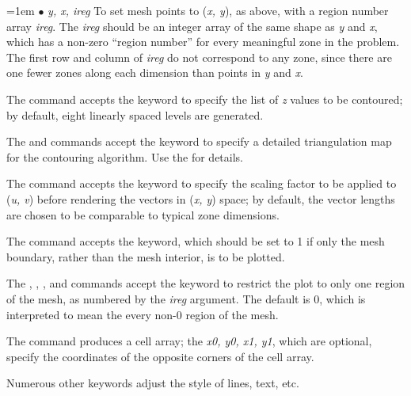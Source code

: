 \hangindent=1em
$\bullet$ {\it y, x, ireg} \hfil\break
To set mesh points to ({\it x, y\/}), as above, with a region number array
{\it ireg}.  The {\it ireg\/} should be an integer array of the same
shape as {\it y\/} and {\it x}, which has a non-zero ``region number'' for
every meaningful zone in the problem.  The first row and column of
{\it ireg\/} do not correspond to any zone, since there are one fewer zones
along each dimension than points in {\it y\/} and {\it x}.

The  command accepts the  keyword to specify the list of
{\it z\/} values to be contoured; by default, eight linearly spaced levels
are generated.

The  and  commands accept the  keyword
to specify a detailed triangulation map for the contouring algorithm.  Use
the  for details.

The  command accepts the  keyword to specify the
scaling factor to be applied to ({\it u, v\/}) before rendering the vectors
in ({\it x, y\/}) space; by default, the vector lengths are chosen to be
comparable to typical zone dimensions.

The  command accepts the  keyword, which should be
set to 1 if only the mesh boundary, rather than the mesh interior, is to
be plotted.

The , , , and  commands accept the
 keyword to restrict the plot to only one region of the
mesh, as numbered by the {\it ireg\/} argument.  The default 
is 0, which is interpreted to mean the every non-0 region of the mesh.

The  command produces a cell array; the {\it x0, y0, x1, y1\/},
which are optional, specify the coordinates of the opposite corners of the
cell array.

Numerous other keywords adjust the style of lines, text, etc.




